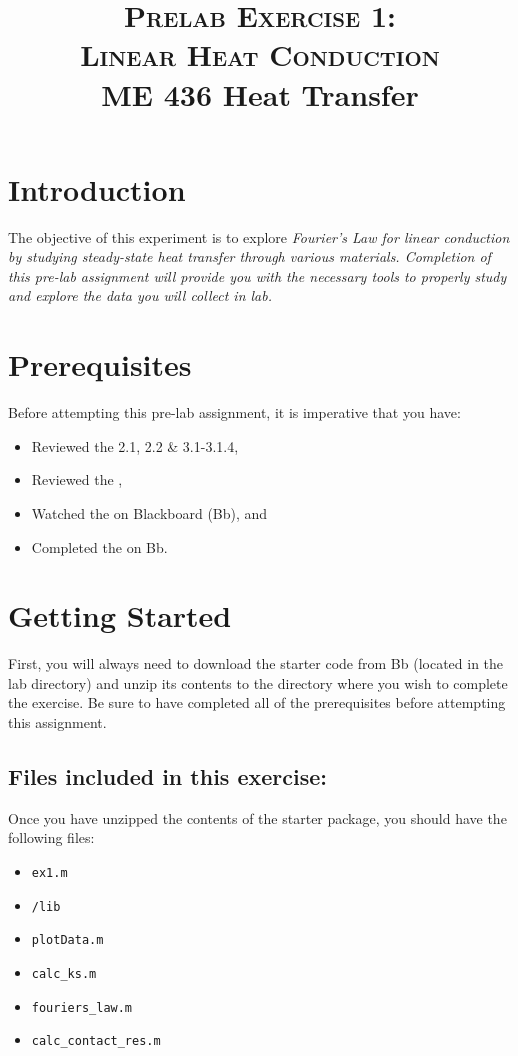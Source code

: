 \documentclass[11pt, letterpaper]{article}
\title{ \textsc{Prelab Exercise 1: \\ Linear Heat Conduction} \\ {\large  \color{darkgray} ME 436 Heat Transfer}}
\begin{document}
\date{}
\maketitle
\thispagestyle{firstpage} 




\section*{Introduction}

The objective of this experiment is to explore \it{Fourier’s Law} for linear conduction by studying steady-state heat transfer through various materials. Completion of this pre-lab assignment will provide you with the necessary tools to properly study and explore the data you will collect in lab.

\section*{Prerequisites}
Before attempting this pre-lab assignment, it is imperative that you have:
{\small
\begin{itemize}
    \item Reviewed the  2.1, 2.2 \& 3.1-3.1.4,
    \item Reviewed the , 
    \item Watched the  on Blackboard (Bb), and
    \item Completed the  on Bb.
\end{itemize}
}

\section*{Getting Started}
First, you will always need to download the starter code from Bb (located in the lab directory) and unzip its contents to the directory where you wish to complete the exercise. Be sure to have completed all of the prerequisites before attempting this assignment.

\subsection*{Files included in this exercise:}
Once you have unzipped the contents of the starter package, you should have the following files:

\begin{itemize}
\renewcommand\labelitemi{-- }
   \item \texttt{ex1.m}
    \item \texttt{/lib}
\renewcommand\labelitemi{[$\star$]}
    \item \texttt{plotData.m}
    \item \texttt{calc\_ks.m}
    \item \texttt{fouriers\_law.m} 
    \item \texttt{calc\_contact\_res.m} 
\end{itemize}
\end{document}
